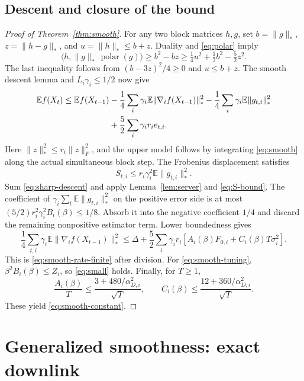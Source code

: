 \documentclass[11pt]{article}
\newcommand{\E}{\mathbb E}
\newcommand{\nuc}[1]{\lVert #1\rVert_*}
\newcommand{\frob}[1]{\lVert #1\rVert_F}
\newcommand{\ip}[2]{\langle #1,#2\rangle}
\newcommand{\pol}{\operatorname{polar}}
\begin{document}
\subsection{Descent and closure of the bound}

\begin{proof}[Proof of Theorem~\ref{thm:smooth}]
For any two block matrices $h,g$, set $b=\nuc g$, $z=\nuc{h-g}$,
and $u=\nuc h\le b+z$. Duality and \eqref{eq:polar} imply
\begin{equation}\label{eq:sharp-pairing}
 \ip{h}{\nuc g\,\pol(g)}\ge b^2-bz
 \ge\tfrac14u^2+\tfrac12b^2-\tfrac52z^2.
\end{equation}
The last inequality follows from $(b-3z)^2/4\ge0$ and $u\le b+z$.
The smooth descent lemma and $L_i\gamma_i\le1/2$ now give
\begin{align}\label{eq:sharp-descent}
 \E f(X_t)\le\E f(X_{t-1})
 &-\frac14\sum_i\gamma_i\E\nuc{\nabla_i f(X_{t-1})}^2
 -\frac14\sum_i\gamma_i\E\nuc{g_{t,i}}^2\notag\\
 &+\frac52\sum_i\gamma_i r_i e_{t,i}.
\end{align}
Here $\nuc z^2\le r_i\frob z^2$, and the upper model follows by
integrating \eqref{eq:smooth} along the actual simultaneous block step.
The Frobenius displacement satisfies
\begin{equation}\label{eq:S-bound}
 S_{t,i}\le r_i\gamma_i^2\E\nuc{g_{t,i}}^2.
\end{equation}
Sum \eqref{eq:sharp-descent} and apply Lemma~\ref{lem:server} and
\eqref{eq:S-bound}. The coefficient of
$\gamma_i\sum_t\E\nuc{g_{t,i}}^2$ on the positive error side is at
most $(5/2)r_i^2\gamma_i^2B_i(\beta)\le1/8$.
Absorb it into the negative coefficient $1/4$ and discard the remaining
nonpositive estimator term. Lower boundedness gives
\[
 \frac14\sum_{t,i}\gamma_i\E\nuc{\nabla_i f(X_{t-1})}^2
 \le\Delta+\frac52\sum_i\gamma_i r_i
           [A_i(\beta)F_{0,i}+C_i(\beta)T\sigma_i^2].
\]
This is \eqref{eq:smooth-rate-finite} after division.
For \eqref{eq:smooth-tuning}, $\beta^2B_i(\beta)\le Z_i$,
so \eqref{eq:small} holds. Finally, for $T\ge1$,
\[
 \frac{A_i(\beta)}T\le
  \frac{3+480/\alpha_{D,i}^2}{\sqrt T},\qquad
 C_i(\beta)\le\frac{12+360/\alpha_{D,i}^2}{\sqrt T}.
\]
These yield \eqref{eq:smooth-constant}.
\end{proof}

\section{Generalized smoothness: exact downlink}
\end{document}
